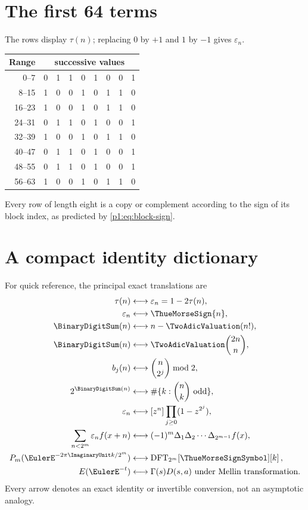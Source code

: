 \documentclass[11pt,oneside]{article}
\numberwithin{equation}{section}
\theoremstyle{definition}
\theoremstyle{remark}
\newcommand{\eps}{\varepsilon}
\newcommand{\ThueMorseDFTCoefficient}[2]{%
  \operatorname{DFT}_{2^{#1}}\!\left[\ThueMorseSignSymbol\right]\!\left[#2\right]%
}
\begin{document}
\appendix

\section[First 64 terms]{The first 64 terms}
\label{p1:app:first-terms}

The rows display \(\tau(n)\); replacing \(0\) by \(+1\) and \(1\) by
\(-1\) gives \(\eps_n\).

\begin{center}
\small
\begin{longtable}{@{}r|*{8}{c}@{}}
\toprule
Range & \multicolumn{8}{c}{successive values}\\
\midrule
\endhead
0--7   & 0&1&1&0&1&0&0&1\\
8--15  & 1&0&0&1&0&1&1&0\\
16--23 & 1&0&0&1&0&1&1&0\\
24--31 & 0&1&1&0&1&0&0&1\\
32--39 & 1&0&0&1&0&1&1&0\\
40--47 & 0&1&1&0&1&0&0&1\\
48--55 & 0&1&1&0&1&0&0&1\\
56--63 & 1&0&0&1&0&1&1&0\\
\bottomrule
\end{longtable}
\end{center}

Every row of length eight is a copy or complement according to the sign of its
block index, as predicted by \eqref{p1:eq:block-sign}.

\section[Identity dictionary]{A compact identity dictionary}
\label{p1:app:identity-dictionary}

For quick reference, the principal exact translations are
\begin{align*}
 \tau(n)
 &\longleftrightarrow \eps_n=1-2\tau(n),\\
 \eps_n
 &\longleftrightarrow \ThueMorseSign{n},\\
 \BinaryDigitSum(n)
 &\longleftrightarrow n-\TwoAdicValuation(n!),\\
 \BinaryDigitSum(n)
 &\longleftrightarrow \TwoAdicValuation\binom{2n}{n},\\
 b_j(n)
 &\longleftrightarrow \binom{n}{2^j}\bmod2,\\
 2^{\BinaryDigitSum(n)}
 &\longleftrightarrow \#\{k:\binom nk\text{ odd}\},\\
 \eps_n
 &\longleftrightarrow [z^n]\prod_{j\ge0}(1-z^{2^j}),\\
 \sum_{n<2^m}\eps_nf(x+n)
 &\longleftrightarrow (-1)^m\Delta_1\Delta_2\cdots
   \Delta_{2^{m-1}}f(x),\\
 P_m(\EulerE^{-2\pi\ImaginaryUnit k/2^m})
 &\longleftrightarrow \ThueMorseDFTCoefficient{m}{k},\\
 E(\EulerE^{-t})
 &\longleftrightarrow \Gamma(s)D(s,a)
  \text{ under Mellin transformation}.
\end{align*}
Every arrow denotes an exact identity or invertible conversion, not an
asymptotic analogy.
\end{document}
